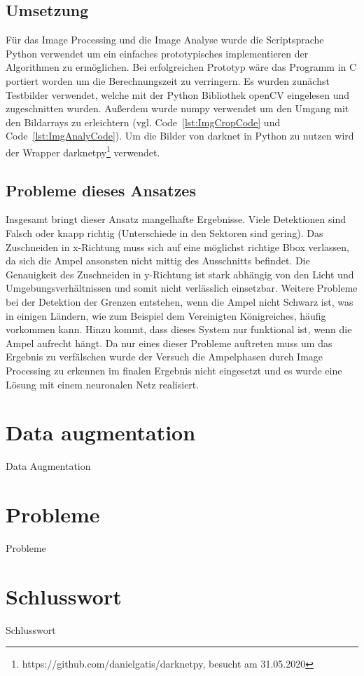 \documentclass[a4paper,oneside,12pt]{report}
\begin{document}
\begin{onehalfspace}
		\section{Umsetzung}
		Für das Image Processing und die Image Analyse wurde die Scriptsprache Python verwendet um ein einfaches prototypisches implementieren der Algorithmen zu ermöglichen. Bei erfolgreichen Prototyp wäre das Programm in C portiert worden um die Berechnungszeit zu verringern. Es wurden zunächst Testbilder verwendet, welche mit der Python Bibliothek openCV eingelesen und zugeschnitten wurden. Außerdem wurde numpy verwendet um den Umgang mit den Bildarrays zu erleichtern (vgl. Code~\ref{lst:ImgCropCode} und Code~\ref{lst:ImgAnalyCode}). Um die Bilder von darknet in Python zu nutzen wird der Wrapper darknetpy\footnote{https://github.com/danielgatis/darknetpy, besucht am 31.05.2020} verwendet.
		
		
		\section{Probleme dieses Ansatzes}
		Insgesamt bringt dieser Ansatz mangelhafte Ergebnisse. Viele Detektionen sind Falsch oder knapp richtig (Unterschiede in den Sektoren sind gering). Das Zuschneiden in x-Richtung muss sich auf eine möglichst richtige Bbox verlassen, da sich die Ampel ansonsten nicht mittig des Ausschnitts befindet. Die Genauigkeit des Zuschneiden in y-Richtung ist stark abhängig von den Licht und Umgebungsverhältnissen und somit nicht verlässlich einsetzbar. Weitere Probleme bei der Detektion der Grenzen entstehen, wenn die Ampel nicht Schwarz ist, was in einigen Ländern, wie zum Beispiel dem Vereinigten Königreiches, häufig vorkommen kann. Hinzu kommt, dass dieses System nur funktional ist, wenn die Ampel aufrecht hängt. Da nur eines dieser Probleme auftreten muss um das Ergebnis zu verfälschen wurde der Versuch die Ampelphasen durch Image Processing zu erkennen im finalen Ergebnis nicht eingesetzt und es wurde eine Lösung mit einem neuronalen Netz realisiert.
		
		
	\end{onehalfspace}
	\chapter{Data augmentation}
	\begin{onehalfspace}
		Data Augmentation
	\end{onehalfspace}
	\chapter{Probleme}
	\begin{onehalfspace}
		Probleme
	\end{onehalfspace}
	\chapter{Schlusswort}
	\begin{onehalfspace}
		Schlusswort
	\end{onehalfspace}
	
\end{document}
